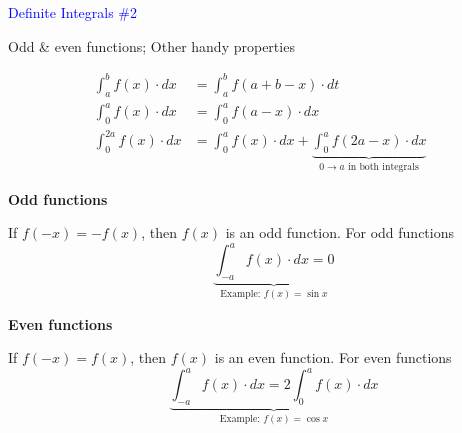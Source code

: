 \documentclass[14pt,fleqn]{extarticle}
\begin{document}
\begin{skill}
\textcolor{blue}{Definite Integrals \#2} 

Odd \& even functions; Other handy properties 
\end{skill} 

\newcard 

\begin{align}
  \int_a^b f(x)\cdot dx &= \int_a^b f \left(a+b-x \right)\cdot dt \\
  \int_0^a f(x)\cdot dx &= \int_0^a f \left(a-x \right)\cdot dx \\
  \int_0^{2a}f(x)\cdot dx &= \int_0^a f(x)\cdot dx
  + \underbrace{\int_0^a f \left(2a-x \right)\cdot dx}_{0\to a \text{ in both integrals}}
\end{align}

\textbf{Odd functions} 

If $f(-x) = -f(x)$, then $f(x)$ is an odd function.
For odd functions
\[ \qquad \underbrace{\int_{-a}^a f(x)\cdot dx = 0}_{\text{Example: }f(x) = \sin x} \]

\textbf{Even functions} 

If $f(-x) = f(x)$, then $f(x)$ is an even function. For even functions
\[ \qquad \underbrace{\int_{-a}^a f(x)\cdot dx = 2\int_0^a f(x)\cdot dx}_{\text{Example: }f(x) = \cos x}\]
\end{document}
